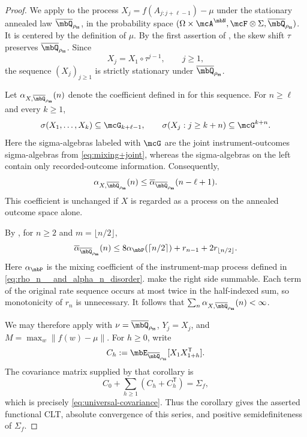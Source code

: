 \documentclass[a4paper]{article}
\numberwithin{equation}{section}   %
\theoremstyle{plain}   %
\theoremstyle{plain}   %
\theoremstyle{examplestyle}
\DeclareMathOperator{\pr}{\mbP}           %
\newcommand{\s}{\rho_{\mathsf{ss}}}     %
\begin{document}
    \begin{proof}
        We apply  to the process $X_j=f(A_{j:j+\ell-1})-\mu$ under the stationary annealed law $\overline\mbQ_{\s}$, in the probability space $(\Omega\times\mcA^\mbN,\mcF\otimes\Sigma,\overline\mbQ_{\s})$.  
        It is centered by the definition of $\mu$.
        By the first assertion of , the skew shift $\tau$ preserves $\overline\mbQ_{\s}$. 
        Since
        \[
            X_j=X_1\circ\tau^{j-1},
            \qquad j\ge1,
        \]
        the sequence $(X_j)_{j\ge1}$ is strictly stationary under $\overline\mbQ_{\s}$.
        
        Let $\alpha_{X,\overline\mbQ_{\s}}(n)$ denote the coefficient defined in  for this sequence. For $n\ge\ell$ and every $k\ge1$,
        \[
         \sigma(X_1,\ldots,X_k)\subseteq\mcG_{k+\ell-1},
         \qquad
         \sigma(X_j:j\ge k+n)\subseteq\mcG^{k+n}.
        \]
        Here the sigma-algebras labeled with $\mcG$ are the joint instrument-outcomes sigma-algebras from \ref{eq:mixing+joint}, whereas the sigma-algebras on the left contain only recorded-outcome information. 
        Consequently,
        \[
         \alpha_{X,\overline\mbQ_{\s}}(n)
         \le\overline\alpha_{\overline\mbQ_{\s}}(n-\ell+1).
        \]
        This coefficient is unchanged if $X$ is regarded as a process on the annealed outcome space alone.
        
        By , for $n\ge2$ and $m=\lfloor n/2\rfloor$,
        \[
         \overline\alpha_{\overline\mbQ_{\s}}(n)
         \le8\alpha_{\pr}(\lceil n/2\rceil)
               +r_{n-1}+2r_{\lfloor n/2\rfloor}.
        \]
        Here $\alpha_{\pr}$ is the mixing coefficient of the instrument-map process defined in \eqref{eq:rho_n__and_alpha_n_disorder}. 
         make the right side summable. 
        Each term of the original rate sequence occurs at most twice in the half-indexed sum, so monotonicity of $r_n$ is unnecessary. 
        It follows that $\sum_n\alpha_{X,\overline\mbQ_{\s}}(n)<\infty$.
        
        We may therefore apply  with $\nu=\overline\mbQ_{\s}$, $Y_j=X_j$, and $M=\max_w\|f(w)-\mu\|$.
        For $h\ge0$, write
        \[
            C_h:=\mbE_{\overline\mbQ_{\s}}
                     [X_1X_{1+h}^{\mathsf T}].
        \]
        The covariance matrix supplied by that corollary is
        \[
            C_0+\sum_{h\ge1}(C_h+C_h^{\mathsf T})
            =\Sigma_f,
        \]
        which is precisely \eqref{eq:universal-covariance}.
        Thus the corollary gives the asserted functional CLT, absolute convergence of this series, and positive semidefiniteness of $\Sigma_f$.


\end{proof}
\end{document}
